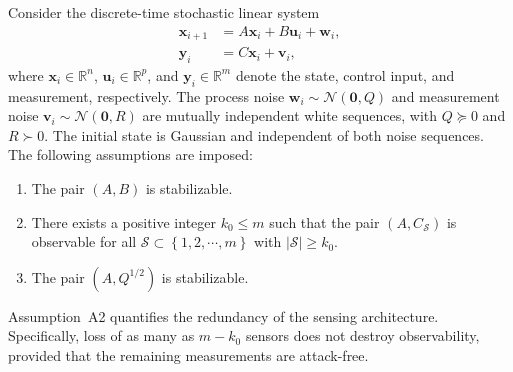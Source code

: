 Consider the discrete-time stochastic linear system
\begin{equation}\label{equ:physical_model}
\begin{aligned}
    \mathbf{x}_{i+1} &= A\mathbf{x}_i+B\mathbf{u}_i+\mathbf{w}_i,\\
    \mathbf{y}_i &= C\mathbf{x}_i+\mathbf{v}_i,
 \end{aligned}
\end{equation}
where $\mathbf{x}_i\in\mathbb{R}^n$, $\mathbf{u}_i\in\mathbb{R}^{p}$, and $\mathbf{y}_i\in\mathbb{R}^{m}$ denote the state, control input, and measurement, respectively. The process noise $\mathbf{w}_i\sim\mathcal{N}(\mathbf{0},Q)$ and measurement noise $\mathbf{v}_i\sim\mathcal{N}(\mathbf{0},R)$ are mutually independent white sequences, with $Q\succeq0$ and $R\succ0$. The initial state is Gaussian and independent of both noise sequences. The following assumptions are imposed:
\begin{enumerate}
    \item [A1.]{The pair $(A,B)$ is stabilizable.}
    \item [A2.]{There exists a positive integer $k_0 \leq m$ such that the pair $(A,C_{\mathcal{S}})$ is observable for all $\mathcal{S} \subset \left\{1,2,\cdots,m\right\}$ with $|\mathcal{S}|\geq k_0$.}
    \item [A3.]{The pair $(A,Q^{1/2})$ is stabilizable.}
\end{enumerate}
Assumption~A2 quantifies the redundancy of the sensing architecture. Specifically, loss of as many as $m-k_0$ sensors does not destroy observability, provided that the remaining measurements are attack-free.

